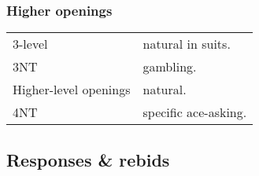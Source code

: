 \documentclass[a4paper,12pt]{article}
\begin{document}
\subsubsection{Higher openings}

\begin{tabular}{ll}
3-level & natural in suits. \\
3NT & gambling. \\
Higher-level openings & natural. \\
4NT & specific ace-asking. \\
\end{tabular}

\newpage 

\subsection{Responses \& rebids}
\end{document}
